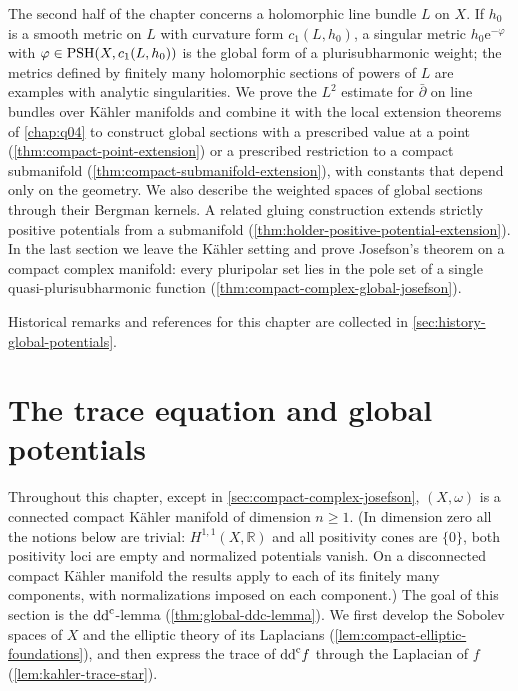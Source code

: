 The second half of the chapter concerns a holomorphic line bundle $L$ on $X$. If $h_0$ is a smooth metric on $L$ with curvature form $c_1(L,h_0)$, a singular metric $h_0\mathrm e^{-\varphi}$ with $\varphi\in\mathrm{PSH}(X,c_1(L,h_0))$ is the global form of a plurisubharmonic weight; the metrics defined by finitely many holomorphic sections of powers of $L$ are examples with analytic singularities. We prove the $L^2$ estimate for $\bar\partial$ on line bundles over K\"ahler manifolds and combine it with the local extension theorems of \cref{chap:q04} to construct global sections with a prescribed value at a point (\cref{thm:compact-point-extension}) or a prescribed restriction to a compact submanifold (\cref{thm:compact-submanifold-extension}), with constants that depend only on the geometry. We also describe the weighted spaces of global sections through their Bergman kernels. A related gluing construction extends strictly positive potentials from a submanifold (\cref{thm:holder-positive-potential-extension}). In the last section we leave the K\"ahler setting and prove Josefson's theorem on a compact complex manifold: every pluripolar set lies in the pole set of a single quasi-plurisubharmonic function (\cref{thm:compact-complex-global-josefson}).

Historical remarks and references for this chapter are collected in \cref{sec:history-global-potentials}.

\section{The trace equation and global potentials}
\label{sec:global-trace-equation}
Throughout this chapter, except in \cref{sec:compact-complex-josefson}, $(X,\omega)$ is a connected compact K\"ahler manifold of dimension $n\geq1$. (In dimension zero all the notions below are trivial: $H^{1,1}(X,\mathbb R)$ and all positivity cones are $\{0\}$, both positivity loci are empty and normalized potentials vanish. On a disconnected compact K\"ahler manifold the results apply to each of its finitely many components, with normalizations imposed on each component.) The goal of this section is the $\mathrm{dd}^{\mathrm{c}}$-lemma (\cref{thm:global-ddc-lemma}). We first develop the Sobolev spaces of $X$ and the elliptic theory of its Laplacians (\cref{lem:compact-elliptic-foundations}), and then express the trace of $\mathrm{dd}^{\mathrm{c}} f$ through the Laplacian of $f$ (\cref{lem:kahler-trace-star}).

